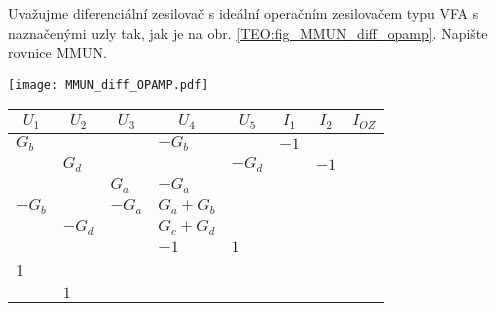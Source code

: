 \begin{mdframed}[style=mdexam]
\begin{example}\label{TEO:ex_DifOpamp01} 
  Uvažujme diferenciální zesilovač s ideální operačním zesilovačem typu VFA s naznačenými 
  uzly tak, jak je na obr. \ref{TEO:fig_MMUN_diff_opamp}. Napište rovnice MMUN.

   {\centering
    \captionsetup{type=figure}
    \texttt{[image: MMUN\_diff\_OPAMP.pdf]}
    \label{TEO:fig_MMUN_diff_opamp}
    \par}

    {\centering
    \begin{tabular}{|C{0.6cm}|C{0.6cm}|C{0.6cm}|C{1.2cm}|C{0.6cm}|C{0.45cm}|C{0.45cm}|C{0.45cm}|}
          &    &   & 
          &    &   & 
          &                       \\
        \hline
        $G_b$  &        &        & $-G_b$    &         & \(-1\) &        &             \\
        \hline
               & $G_d$  &        &           & $-G_d$  &        & \(-1\) &             \\
        \hline
               &        &  $G_a$ & $-G_a$    &         &        &        &             \\
        \hline 
        $-G_b$ &        & $-G_a$ & $G_a+G_b$ &         &        &        &             \\
        \hline
               & $-G_d$ &        & $G_c+G_d$ &         &        &        &             \\
        \hline
               &        &        &  \(-1\)   &  \(1\)  &        &        &             \\
             &        &        &           &         &        &        &             \\
        \hline   
               & \(1\)  &        &           &         &        &        &             \\
        \hline    
    \end{tabular}
    \par}
\end{example}
\end{mdframed}